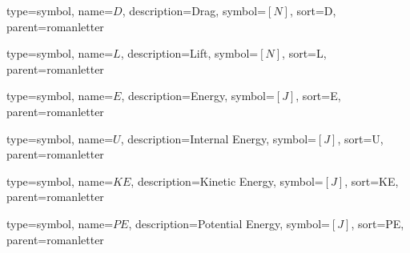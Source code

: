 {
type=symbol, %
name={\ensuremath{D}}, %
description={Drag}, %
symbol={$\left[N\right]$}, %
sort=D, %
parent=romanletter %
}

{
type=symbol, %
name={\ensuremath{L}}, %
description={Lift}, %
symbol={$\left[N\right]$}, %
sort=L, %
parent=romanletter %
}

{
type=symbol, %
name={\ensuremath{E}}, %
description={Energy}, %
symbol={$\left[J\right]$}, %
sort=E, %
parent=romanletter %
}

{
type=symbol, %
name={\ensuremath{U}}, %
description={Internal Energy}, %
symbol={$\left[J\right]$}, %
sort=U, %
parent=romanletter %
}

{
type=symbol, %
name={\ensuremath{KE}}, %
description={Kinetic Energy}, %
symbol={$\left[J\right]$}, %
sort=KE, %
parent=romanletter %
}

{
type=symbol, %
name={\ensuremath{PE}}, %
description={Potential Energy}, %
symbol={$\left[J\right]$}, %
sort=PE, %
parent=romanletter %
}

